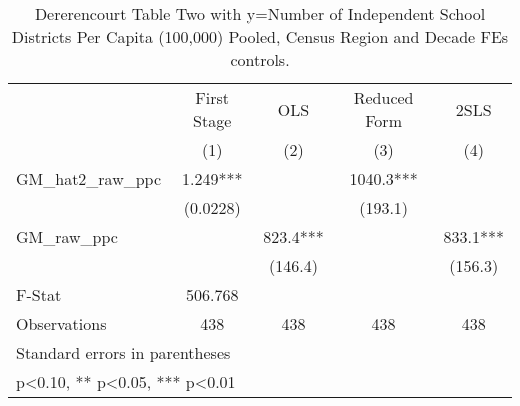 \begin{table}[htbp]\centering
\def\sym#1{\ifmmode^{#1}\else\(^{#1}\)\fi}
\caption{Dererencourt Table Two with y=Number of Independent School Districts Per Capita (100,000) Pooled, Census Region and Decade FEs controls.}
\begin{tabular}{l*{4}{c}}
\toprule
                    & First Stage   &         OLS   &Reduced Form   &        2SLS   \\
                    &\multicolumn{1}{c}{(1)}   &\multicolumn{1}{c}{(2)}   &\multicolumn{1}{c}{(3)}   &\multicolumn{1}{c}{(4)}   \\
\midrule
GM\_hat2\_raw\_ppc     &       1.249***&               &      1040.3***&               \\
                    &    (0.0228)   &               &     (193.1)   &               \\
\addlinespace
GM\_raw\_ppc          &               &       823.4***&               &       833.1***\\
                    &               &     (146.4)   &               &     (156.3)   \\
\midrule
F-Stat              &     506.768   &               &               &               \\
Observations        &         438   &         438   &         438   &         438   \\
\bottomrule
\multicolumn{5}{l}{\footnotesize Standard errors in parentheses}\\
\multicolumn{5}{l}{\footnotesize * p<0.10, ** p<0.05, *** p<0.01}\\
\end{tabular}
\end{table}
